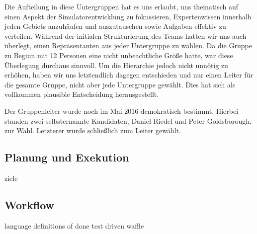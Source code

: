 Die Aufteilung in diese Untergruppen hat es uns erlaubt, uns thematisch auf einen Aspekt der Simulatorentwicklung zu fokussieren, Expertenwissen innerhalb jeden Gebiets anzuhäufen und auszutauschen sowie Aufgaben effektiv zu verteilen. Während der initialen Strukturierung des Teams hatten wir uns auch überlegt, einen Repräsentanten aus jeder Untergruppe zu wählen. Da die Gruppe zu Beginn mit 12 Personen eine nicht unbeachtliche Größe hatte, war diese Überlegung durchaus sinnvoll. Um die Hierarchie jedoch nicht unnötig zu erhöhen, haben wir uns letztendlich dagegen entschieden und nur einen Leiter für die gesamte Gruppe, nicht aber jede Untergruppe gewählt. Dies hat sich als vollkommen plausible Entscheidung herausgestellt.

Der Gruppenleiter wurde noch im Mai 2016 demokratisch bestimmt. Hierbei standen zwei selbsternannte Kandidaten, Daniel Riedel und Peter Goldsborough, zur Wahl. Letzterer wurde schließlich zum Leiter gewählt.

\subsection{Planung und Exekution}
\label{team:orga-plan}

ziele

\subsection{Workflow}
\label{team:orga-workflow}

language
definitions of done
test driven
waffle
